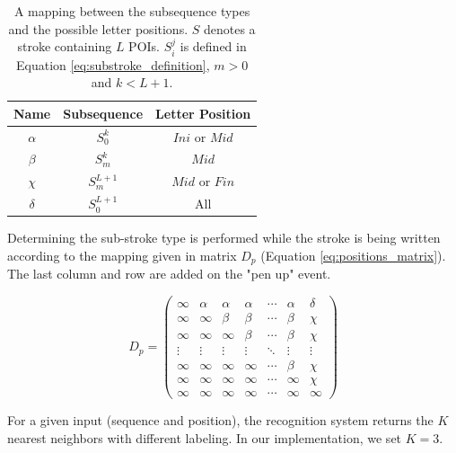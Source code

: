 \documentclass[10pt, conference, compsocconf]{IEEEtran}
\begin{document}
\begin{table}
\centering
\renewcommand{\arraystretch}{1.3}
\caption{A mapping between the subsequence types and the possible letter positions. $S$ denotes a stroke containing $L$ POIs. $S_i^j$ is defined in Equation \ref{eq:substroke_definition}, $m>0$ and $k<L+1$. }
\begin{tabular}{| c |c | c |}
\hline
  Name     & Subsequence    & Letter Position       \\
\hline
  $\alpha$ & $S_0^{k}$         & $Ini$ or $Mid$  \\
\hline
  $\beta$  & $S_{m}^{k}$     & $Mid$              \\
\hline
  $\chi$    & $S_{m}^{L+1}$ & $Mid$ or $Fin$   \\
\hline
  $\delta$ & $S_0^{L+1}$     & All                   \\
\hline
\end{tabular}
\label{table:subsequences_types}
\vspace{-10pt}
\end{table}
Determining the sub-stroke type is performed while the stroke is being written according to the mapping given in matrix $D_p$ (Equation \ref{eq:positions_matrix}). 
The last column and row are added on the "pen up" event.

\begin{equation}
D_{p}=
\left( 
\begin{array}{ccccccc}
\infty 	& \alpha & \alpha & \alpha  & \cdots & \alpha & \delta \\
\infty  & \infty  & \beta   & \beta   & \cdots  & \beta  & \chi    \\
\infty  & \infty  & \infty   & \beta   & \cdots  & \beta  & \chi    \\
\vdots & \vdots & \vdots  & \vdots & \ddots  & \vdots & \vdots \\
\infty  & \infty  & \infty   & \infty   & \cdots  & \beta  & \chi    \\
\infty  & \infty  & \infty   & \infty   & \cdots  & \infty  & \chi    \\
\infty  & \infty  & \infty   & \infty   & \cdots  & \infty  & \infty \end{array} \right)
\label{eq:positions_matrix}
\end{equation}

For a given input (sequence and position), the recognition system returns the $K$ nearest neighbors with different labeling. In our implementation, we set $K=3$.\\
\end{document}
